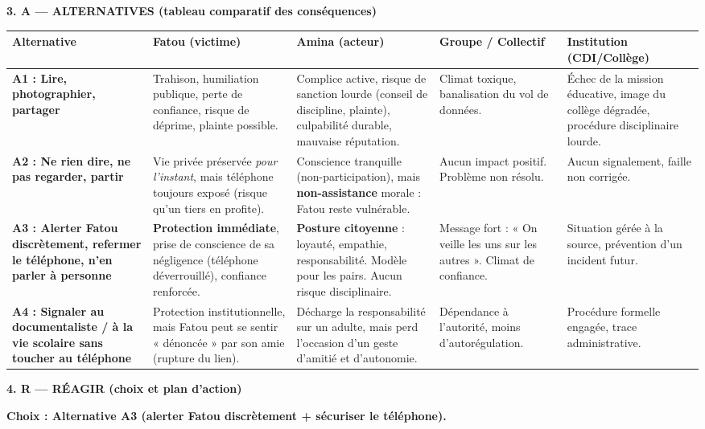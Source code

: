 \documentclass[11pt]{article}
\begin{document}
\begin{experience}
\noindent\textbf{3. A — ALTERNATIVES (tableau comparatif des conséquences)}
\begin{center}
\begin{tabularx}{\linewidth}{|l|X|X|X|X|}\hline
\textbf{Alternative} & \textbf{Fatou (victime)} & \textbf{Amina (acteur)} & \textbf{Groupe / Collectif} & \textbf{Institution (CDI/Collège)} \\\hline
\textbf{A1 : Lire, photographier, partager} & Trahison, humiliation publique, perte de confiance, risque de déprime, plainte possible. & Complice active, risque de sanction lourde (conseil de discipline, plainte), culpabilité durable, mauvaise réputation. & Climat toxique, banalisation du vol de données. & Échec de la mission éducative, image du collège dégradée, procédure disciplinaire lourde. \\\hline
\textbf{A2 : Ne rien dire, ne pas regarder, partir} & Vie privée préservée \emph{pour l'instant}, mais téléphone toujours exposé (risque qu'un tiers en profite). & Conscience tranquille (non-participation), mais \textbf{non-assistance} morale : Fatou reste vulnérable. & Aucun impact positif. Problème non résolu. & Aucun signalement, faille non corrigée. \\\hline
\textbf{A3 : Alerter Fatou discrètement, refermer le téléphone, n'en parler à personne} & \textbf{Protection immédiate}, prise de conscience de sa négligence (téléphone déverrouillé), confiance renforcée. & \textbf{Posture citoyenne} : loyauté, empathie, responsabilité. Modèle pour les pairs. Aucun risque disciplinaire. & Message fort : « On veille les uns sur les autres ». Climat de confiance. & Situation gérée à la source, prévention d'un incident futur. \\\hline
\textbf{A4 : Signaler au documentaliste / à la vie scolaire sans toucher au téléphone} & Protection institutionnelle, mais Fatou peut se sentir « dénoncée » par son amie (rupture du lien). & Décharge la responsabilité sur un adulte, mais perd l'occasion d'un geste d'amitié et d'autonomie. & Dépendance à l'autorité, moins d'autorégulation. & Procédure formelle engagée, trace administrative. \\\hline
\end{tabularx}
\end{center}

\noindent\textbf{4. R — RÉAGIR (choix et plan d'action)}

\textbf{Choix : Alternative A3 (alerter Fatou discrètement + sécuriser le téléphone).}


\end{experience}
\end{document}
